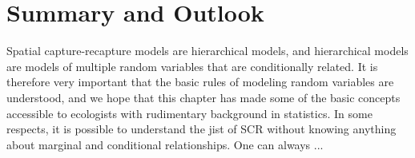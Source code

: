 \section{Summary and Outlook}


Spatial capture-recapture models are hierarchical models, and hierarchical
models are models of multiple random variables that are conditionally
related. It is therefore very important that the basic rules of
modeling random variables are understood, and we hope that this chapter
has made some of the basic concepts accessible to ecologists with
rudimentary background in statistics. In some respects, it is possible
to understand the jist of SCR without knowing anything about marginal
and conditional relationships. One can always ...